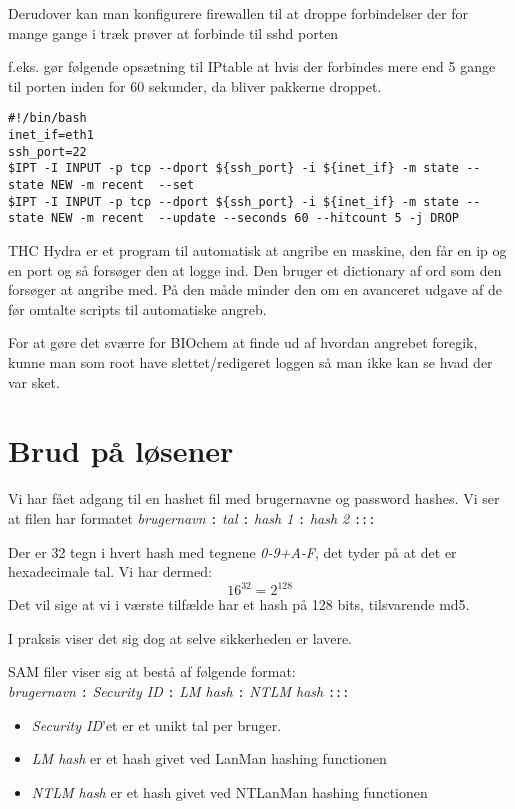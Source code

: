 \documentclass[10pt,a4paper,danish]{article}
\begin{document}
Derudover kan man konfigurere firewallen til at droppe forbindelser der for
mange gange i træk prøver at forbinde til sshd porten

f.eks. gør følgende opsætning\cite{portdrop} til IPtable at hvis der forbindes mere end 5 gange
til porten inden for 60 sekunder, da bliver pakkerne droppet.
\begin{verbatim}
#!/bin/bash
inet_if=eth1
ssh_port=22
$IPT -I INPUT -p tcp --dport ${ssh_port} -i ${inet_if} -m state --state NEW -m recent  --set
$IPT -I INPUT -p tcp --dport ${ssh_port} -i ${inet_if} -m state --state NEW -m recent  --update --seconds 60 --hitcount 5 -j DROP
\end{verbatim}


THC Hydra er et program til automatisk at angribe en maskine, den får en ip og en
port og så forsøger den at logge ind. Den bruger et dictionary af ord som den
forsøger at angribe med.
På den måde minder den om en avanceret udgave af de før omtalte scripts til
automatiske angreb.

For at gøre det sværre for BIOchem at finde ud af hvordan angrebet foregik,
kunne man som root have slettet/redigeret loggen så man ikke kan se hvad der var
sket.


\section{Brud på løsener}

Vi har fået adgang til en hashet fil med brugernavne og password hashes.
Vi ser at filen har formatet \textit{brugernavn} \texttt{:} \textit{tal}
\texttt{:} \textit{hash 1} \texttt{:} \textit{hash 2} \texttt{:::}

Der er 32 tegn i hvert hash med tegnene \textit{0-9+A-F}, det tyder på at det er
hexadecimale tal. Vi har dermed:
\[16^{32} = 2^{128}\]
Det vil sige at vi i værste tilfælde har et hash på 128 bits, tilsvarende md5.

I praksis viser det sig dog at selve sikkerheden er lavere.

SAM filer viser sig at bestå af følgende format\cite{cracking}:\\
\textit{brugernavn} \texttt{:} \textit{Security ID}
\texttt{:} \textit{LM hash} \texttt{:} \textit{NTLM hash} \texttt{:::}
\begin{itemize}
\item \textit{Security ID}'et er et unikt tal per bruger.
\item \textit{LM hash} er et hash givet ved LanMan hashing functionen
\item \textit{NTLM hash} er et hash givet ved NTLanMan hashing functionen
\end{itemize}
\end{document}
